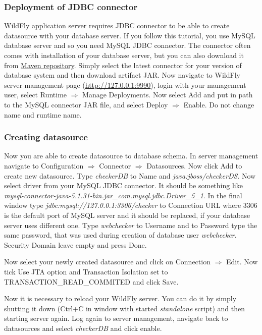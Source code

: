 \documentclass[12pt,a4paper]{article}
\begin{document}
\subsubsection{Deployment of JDBC connector}
WildFly application server requires JDBC connector to be able to create datasource with your database server. If you follow this tutorial, you use MySQL database server and so you need MySQL JDBC connector. The connector often comes with installation of your database server, but you can also download it from \href{http://mvnrepository.com/artifact/mysql/mysql-connector-java/5.1.33}{Maven repository}. Simply select the latest connector for your version of database system and then download artifact JAR. 
Now navigate to WildFly server management page (\url{http://127.0.0.1:9990}), login with your management user, select Runtime $\Rightarrow$ Manage Deployments. Now select Add and put in path to the MySQL connector JAR file, and select Deploy $\Rightarrow$ Enable. Do not change name and runtime name.

\subsubsection{Creating datasource}
Now you are able to create datasource to database schema. In server management navigate to Configuration $\Rightarrow$ Connector $\Rightarrow$ Datasources. Now click Add to create new datasource. Type \textit{checkerDB} to Name and \textit{java:jboss/checkerDS}. Now select driver from your MySQL JDBC connector. It should be something like \textit{mysql-connector-java-5.1.31-bin.jar\_com.mysql.jdbc.Driver\_5\_1}. In the final window type \textit{jdbc:mysql://127.0.0.1:3306/checker} to Connection URL where 3306 is the default port of MySQL server and it should be replaced, if your database server uses different one. Type \textit{webchecker} to Username and to Password type the same password, that was used during creation of database user \textit{webchecker}. Security Domain leave empty and press Done.

Now select your newly created datasource and click on Connection $\Rightarrow$ Edit. Now tick Use JTA option and Transaction Isolation set to \\TRANSACTION\_READ\_COMMITED and click Save.

Now it is necessary to reload your WildFly server. You can do it by simply shutting it down (Ctrl+C in window with started \textit{standalone} script) and then starting server again. Log again to server management, navigate back to datasources and select \textit{checkerDB} and click enable.
\end{document}
